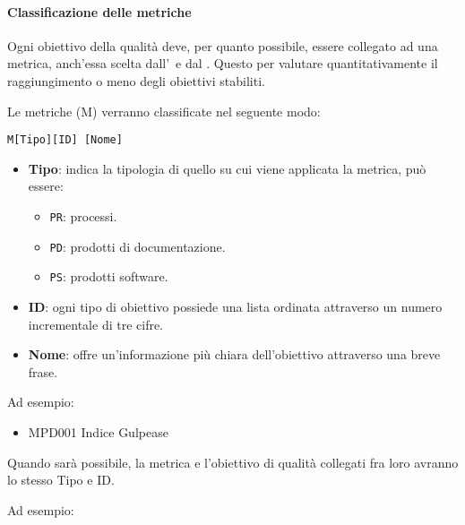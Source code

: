         
        \paragraph{Classificazione delle metriche}\label{Classificazione metriche}
        Ogni obiettivo della qualità deve, per quanto possibile, essere collegato ad una metrica, anch'essa scelta dall'\Amm\ e dal \Ver. Questo per valutare
        quantitativamente il raggiungimento o meno degli obiettivi stabiliti.
        
        Le metriche (M) verranno classificate nel seguente modo:
        
        \begin{center}
            \texttt{M[Tipo][ID] [Nome]}
        \end{center}
        
        \begin{itemize}
            \item \textbf{Tipo}: indica la tipologia di quello su cui viene applicata la metrica, può essere:
            \begin{itemize}
                \item \texttt{PR}: processi.
                \item \texttt{PD}: prodotti di documentazione.
                \item \texttt{PS}: prodotti software.
            \end{itemize}
            
            \item \textbf{ID}: ogni tipo di obiettivo possiede una lista ordinata attraverso un numero incrementale di tre cifre.
            \item \textbf{Nome}: offre un'informazione più chiara dell'obiettivo attraverso una breve frase.
        \end{itemize}
        
        Ad esempio:
        
        \begin{itemize}
            \item MPD001 Indice Gulpease
        \end{itemize}
        
        Quando sarà possibile, la metrica e l'obiettivo di qualità collegati fra loro avranno lo stesso Tipo e ID.
        
        Ad esempio:
        
